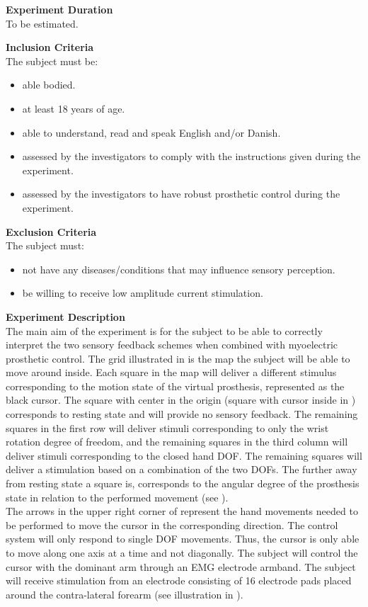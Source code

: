 \textbf{Experiment Duration} \\
To be estimated.

\textbf{Inclusion Criteria} \\
The subject must be:
\vspace{-15pt}
\begin{itemize}
	\item able bodied. %
	\item at least 18 years of age.
	\item able to understand, read and speak English and/or Danish.
	\item assessed by the investigators to comply with the instructions given during the experiment.
	\item assessed by the investigators to have robust prosthetic control during the experiment.
\end{itemize}

\textbf{Exclusion Criteria} \\
The subject must:
\vspace{-15pt}
\begin{itemize}
	\item not have any diseases/conditions that may influence sensory perception.
	\item be willing to receive low amplitude current stimulation. 
\end{itemize}

\textbf{{\Large Experiment Description}} \\
\newline
The main aim of the experiment is for the subject to be able to correctly interpret the two sensory feedback schemes when combined with myoelectric prosthetic control. The grid illustrated in  is the map the subject will be able to move around inside. Each square in the map will deliver a different stimulus corresponding to the motion state of the virtual prosthesis, represented as the black cursor. The square with center in the origin (square with cursor inside in ) corresponds to resting state and will provide no sensory feedback. The remaining squares in the first row will deliver stimuli corresponding to only the wrist rotation degree of freedom, and the remaining squares in the third column will deliver stimuli corresponding to the closed hand DOF. The remaining squares will deliver a stimulation based on a combination of the two DOFs. The further away from resting state a square is, corresponds to the angular degree of the prosthesis state in relation to the performed movement (see ). \\
The arrows in the upper right corner of  represent the hand movements needed to be performed to move the cursor in the corresponding direction. The control system will only respond to single DOF movements. Thus, the cursor is only able to move along one axis at a time and not diagonally. The subject will control the cursor with the dominant arm through an EMG electrode armband. The subject will receive stimulation from an electrode consisting of 16 electrode pads placed around the contra-lateral forearm (see illustration in ).

